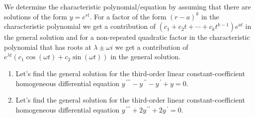 \documentclass{ximera}
\begin{document}
We determine the characteristic polynomial/equation by assuming that there are solutions of the form $y=e^{rt}$.  For a factor of the form $(r-a)^k$ in the characteristic polynomial we get a contribution of $(c_1+c_2 t+\cdots +c_{k}t^{k-1})e^{at}$ in the general solution and for a non-repeated quadratic factor in the characteristic polynomial that has roots at $\lambda\pm \omega i$ we get a contribution of\\ $e^{\lambda t}(c_1\cos{(\omega t)}+c_2\sin{(\omega t)})$ in the general solution.


\begin{enumerate}


\item Let's find  the general solution for the third-order linear constant-coefficient homogeneous differential equation $y^{\,\prime\prime\prime}-y^{\,\prime\prime}-y^{\,\prime}+y=0$.

\vfill

\item Let's find  the general solution for the third-order linear constant-coefficient homogeneous differential equation $y^{\,\prime\prime\prime}+2y^{\,\prime\prime}+2y^{\,\prime}=0$.

\vfill


\end{enumerate}
\end{document}

